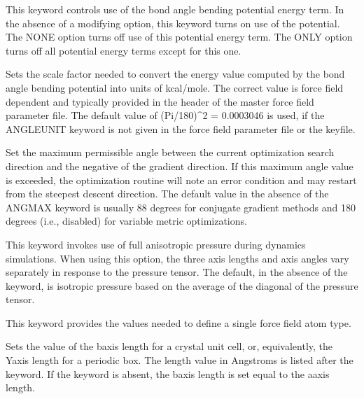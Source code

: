\documentclass[letterpaper,11pt,english]{sphinxmanual}
\begin{document}

  This keyword controls use of the bond angle bending potential energy term. In the absence of a modifying option, this keyword turns on use of the potential. The NONE option turns off use of this potential energy term. The ONLY option turns off all potential energy terms except for this one.

  Sets the scale factor needed to convert the energy value computed by the bond angle bending potential into units of kcal/mole. The correct value is force field dependent and typically provided in the header of the master force field parameter file. The default value of (Pi/180)\textasciicircum{}2 = 0.0003046 is used, if the ANGLEUNIT keyword is not given in the force field parameter file or the keyfile.

  Set the maximum permissible angle between the current optimization search direction and the negative of the gradient direction. If this maximum angle value is exceeded, the optimization routine will note an error condition and may restart from the steepest descent direction. The default value in the absence of the ANGMAX keyword is usually 88 degrees for conjugate gradient methods and 180 degrees (i.e., disabled) for variable metric optimizations.




  This keyword invokes use of full anisotropic pressure during dynamics simulations. When using this option, the three axis lengths and axis angles vary separately in response to the pressure tensor. The default, in the absence of the keyword, is isotropic pressure based on the average of the diagonal of the pressure tensor.


  This keyword provides the values needed to define a single force field atom type.



  Sets the value of the b\sphinxhyphen{}axis length for a crystal unit cell, or, equivalently,  the Y\sphinxhyphen{}axis length for a periodic box. The length value in Angstroms is listed after the keyword. If the keyword is absent, the b\sphinxhyphen{}axis length is set equal to the a\sphinxhyphen{}axis length.
\end{document}
